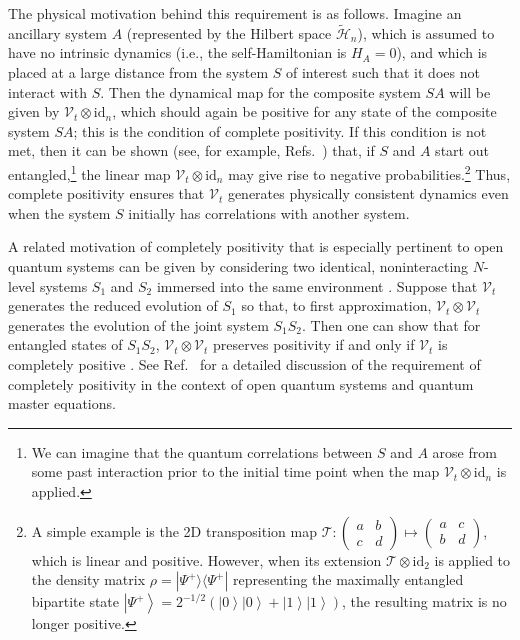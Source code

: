 \documentclass[3p,sort&compress,12pt]{elsarticle}
\newcommand{\ket}[1]{\left\vert{#1}\right\rangle}
\newcommand{\ketbra}[2]{\ensuremath{|{#1 \rangle}{\langle #2}|}}
\newcommand{\op}[1]{#1}
\begin{document}
\begin{enumerate}
The physical motivation behind this requirement is as follows. Imagine an ancillary system $A$ (represented by the Hilbert space $\tilde{\mathcal{H}}_n$), which is assumed to have no intrinsic dynamics (i.e., the self-Hamiltonian is $H_A=0$), and which is placed at a large distance from the system $S$ of interest such that it does not interact with $S$. Then the dynamical map for the composite system $SA$ will be given by $\mathcal{V}_t \otimes \text{id}_n$, which should again be positive for any state of the composite system $SA$; this is the condition of complete positivity. If this condition is not met, then it can be shown (see, for example, Refs.~\cite{Horodecki:1995:oo,Peres:1996:oo,Alicki:2001:aa,Benatti:2005:ii}) that, if $S$ and $A$ start out entangled,\footnote{We can imagine that the quantum correlations between $S$ and $A$ arose from some past interaction prior to the initial time point when the map  $\mathcal{V}_t \otimes \text{id}_n$ is applied.} the linear map $\mathcal{V}_t \otimes \text{id}_n$ may give rise to negative probabilities.\footnote{A simple example is the 2D transposition map $\mathcal{T} : \left(\begin{smallmatrix}a&b\\c&d\end{smallmatrix}\right) \mapsto \left(\begin{smallmatrix}a&c\\b&d\end{smallmatrix}\right)$, which is linear and positive. However, when its extension $\mathcal{T}\otimes\text{id}_2$ is applied to the density matrix $\op{\rho}=\ketbra{\Psi^+}{\Psi^+}$ representing the maximally entangled bipartite state $\ket{\Psi^+}=2^{-1/2}\left(\ket{0}\ket{0}+\ket{1}\ket{1}\right)$, the resulting matrix is no longer positive.} Thus, complete positivity ensures that $\mathcal{V}_t$ generates physically consistent dynamics even when the system $S$ initially has correlations with another system. 

A related motivation of completely positivity that is especially pertinent to open quantum systems can be given by considering two identical, noninteracting $N$-level systems $S_1$ and $S_2$ immersed into the same environment \cite{Benatti:2002:oo,Benatti:2005:ii}. Suppose that $\mathcal{V}_t$ generates the reduced evolution of $S_1$ so that, to first approximation, $\mathcal{V}_t\otimes \mathcal{V}_t$ generates the evolution of the joint system $S_1S_2$. Then one can show that for entangled states of $S_1S_2$, $\mathcal{V}_t\otimes \mathcal{V}_t$ preserves positivity if and only if $\mathcal{V}_t$ is completely positive \cite{Benatti:2002:oo}. See Ref.~\cite{Benatti:2005:ii} for a detailed discussion of the requirement of completely positivity in the context of open quantum systems and quantum master equations.


\end{enumerate}
\end{document}
